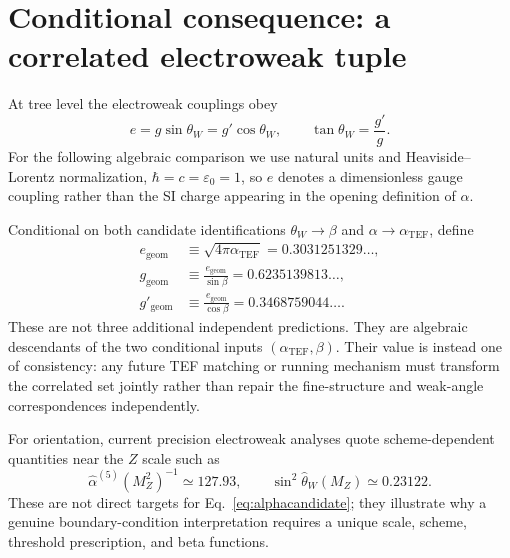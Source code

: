 \documentclass[10pt,twocolumn]{article}
\newcommand{\TEF}{\mathrm{TEF}}
\newcommand{\geom}{\mathrm{geom}}
\begin{document}
\section{Conditional consequence: a correlated electroweak tuple}
\label{sec:ewseed}

At tree level the electroweak couplings obey
\begin{equation}
e=g\sin\theta_W=g'\cos\theta_W,
\qquad
\tan\theta_W=\frac{g'}{g}.
\label{eq:ewrelations}
\end{equation}
For the following algebraic comparison we use natural units and Heaviside--Lorentz normalization,
$\hbar=c=\varepsilon_0=1$, so $e$ denotes a dimensionless gauge coupling rather than the SI charge
appearing in the opening definition of $\alpha$.

Conditional on both candidate identifications
$\theta_W\rightarrow\beta$ and $\alpha\rightarrow\alpha_{\TEF}$, define
\begin{align}
e_{\geom}&\equiv\sqrt{4\pi\alpha_{\TEF}}
=0.3031251329\ldots,\\
g_{\geom}&\equiv\frac{e_{\geom}}{\sin\beta}
=0.6235139813\ldots,\\
g'_{\geom}&\equiv\frac{e_{\geom}}{\cos\beta}
=0.3468759044\ldots.
\label{eq:geomcouplings}
\end{align}
These are not three additional independent predictions.  They are algebraic descendants of the two
conditional inputs $(\alpha_{\TEF},\beta)$.  Their value is instead one of consistency: any future
TEF matching or running mechanism must transform the correlated set jointly rather than repair the
fine-structure and weak-angle correspondences independently.

For orientation, current precision electroweak analyses quote scheme-dependent quantities near the
$Z$ scale such as \cite{PDG2026}
\begin{equation}
\hat\alpha^{(5)}(M_Z^2)^{-1}\simeq127.93,
\qquad
\sin^2\hat\theta_W(M_Z)\simeq0.23122.
\label{eq:pdgbench}
\end{equation}
These are not direct targets for Eq.~\eqref{eq:alphacandidate}; they illustrate why a genuine
boundary-condition interpretation requires a unique scale, scheme, threshold prescription, and beta
functions.
\end{document}
